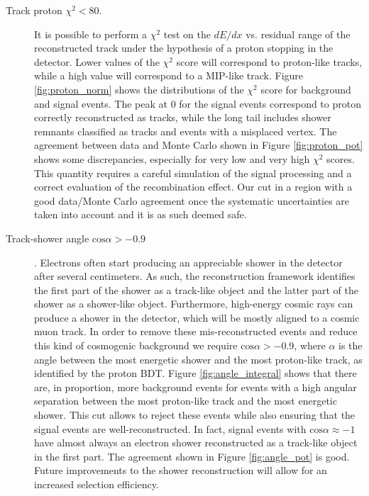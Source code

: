 \begin{description}
\item[Track proton $\chi^2 < 80$.] It is possible to perform a $\chi^2$ test on the $dE/dx$ vs. residual range of the reconstructed track under the hypothesis of a proton stopping in the detector. Lower values of the $\chi^2$ score will correspond to proton-like tracks, while a high value will correspond to a MIP-like track. Figure \ref{fig:proton_norm} shows the distributions of the $\chi^2$ score for background and signal events. The peak at 0 for the signal events correspond to proton correctly reconstructed as tracks, while the long tail includes shower remnants classified as tracks and events with a misplaced vertex. The agreement between data and Monte Carlo shown in Figure \ref{fig:proton_pot} shows some discrepancies, especially for very low and very high $\chi^2$ scores. This quantity requires a careful simulation of the signal processing and a correct evaluation of the recombination effect. Our cut in a region with a good data/Monte Carlo agreement once the systematic uncertainties are taken into account and it is as such deemed safe.

\item[Track-shower angle $\mathrm{cos}\alpha > -0.9$]. Electrons often start producing an appreciable shower in the detector after several centimeters. As such, the reconstruction framework identifies the first part of the shower as a track-like object and the latter part of the shower as a shower-like object. 
Furthermore, high-energy cosmic rays can produce a shower in the detector, which will be mostly aligned to a cosmic muon track. In order to remove these mis-reconstructed events and reduce this kind of cosmogenic background we require $\mathrm{cos}\alpha > -0.9$, where $\alpha$ is the angle between the most energetic shower and the most proton-like track, as identified by the proton BDT.
Figure \ref{fig:angle_integral} shows that there are, in proportion, more background events for events with a high angular separation between the most proton-like track and the most energetic shower. This cut allows to reject these events while also ensuring that the signal events are well-reconstructed. In fact, signal events with $\mathrm{cos}\alpha \approx -1$ have almost always an electron shower reconstructed as a track-like object in the first part. The agreement shown in Figure \ref{fig:angle_pot} is good. Future improvements to the shower reconstruction will allow for an increased selection efficiency.



\end{description}
